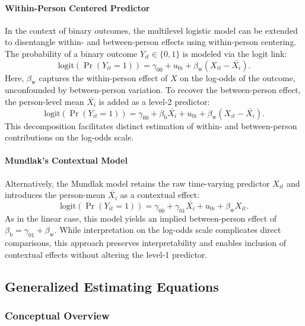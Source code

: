 \documentclass[stu]{apa7}
\begin{document}
\paragraph{Within-Person Centered Predictor}

In the context of binary outcomes, the multilevel logistic model can be extended to disentangle within- and between-person effects using within-person centering. The probability of a binary outcome \( Y_{it} \in \{0,1\} \) is modeled via the logit link:
\begin{equation}
\text{logit}(\Pr(Y_{it} = 1)) = \gamma_{00} + u_{0i} + \beta_\text{w} (X_{it} - \bar{X_i}).
\end{equation}
Here, \( \beta_\text{w} \) captures the within-person effect of \( X \) on the log-odds of the outcome, unconfounded by between-person variation. To recover the between-person effect, the person-level mean \( \bar{X_i} \) is added as a level-2 predictor:
\begin{equation}
\text{logit}(\Pr(Y_{it} = 1)) = \gamma_{00} + \beta_\text{b} \bar{X_i} + u_{0i} + \beta_\text{w} (X_{it} - \bar{X_i}).
\end{equation}
This decomposition facilitates distinct estimation of within- and between-person contributions on the log-odds scale.

\paragraph{Mundlak’s Contextual Model}

Alternatively, the Mundlak model retains the raw time-varying predictor \( X_{it} \) and introduces the person-mean \( \bar{X_i} \) as a contextual effect:
\begin{equation}
\text{logit}(\Pr(Y_{it} = 1)) = \gamma_{00} + \gamma_{01} \bar{X_i} + u_{0i} + \beta_\text{w} X_{it}.
\end{equation}
As in the linear case, this model yields an implied between-person effect of \( \beta_\text{b} = \gamma_{01} + \beta_\text{w} \). While interpretation on the log-odds scale complicates direct comparisons, this approach preserves interpretability and enables inclusion of contextual effects without altering the level-1 predictor.


\subsection{Generalized Estimating Equations}

\subsubsection{Conceptual Overview}
\end{document}
